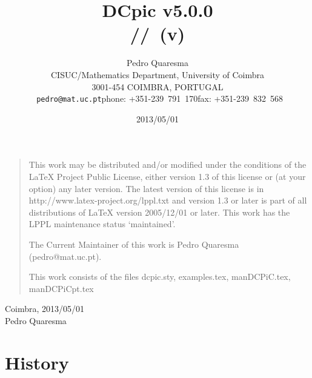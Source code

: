 \documentclass[11pt]{article}
\newcommand{\docversion}{\svnyear/\svnmonth/\svnday\ (v\svnrev)}
\def\dcpicversion{v5.0.0}
\begin{document}
\title{DCpic \dcpicversion\\
\docversion}
\author{Pedro Quaresma\\ CISUC/Mathematics Department,
  University of Coimbra\\ 3001-454 COIMBRA, PORTUGAL\\ {\tt
    pedro@mat.uc.pt}\quad phone: +351-239~791~170\quad fax:
  +351-239~832~568}  
\date{2013/05/01}


\maketitle

\vfill
\begin{quotation}
This work may be distributed and/or modified under the
conditions of the LaTeX Project Public License, either version 1.3
of this license or (at your option) any later version.
The latest version of this license is in
  http://www.latex-project.org/lppl.txt
and version 1.3 or later is part of all distributions of LaTeX
version 2005/12/01 or later.
This work has the LPPL maintenance status `maintained'.

The Current Maintainer of this work is Pedro Quaresma (pedro@mat.uc.pt).

This work consists of the files dcpic.sty, examples.tex,
manDCPiC.tex, manDCPiCpt.tex
\end{quotation}

\vspace*{2cm}
\noindent Coimbra, 2013/05/01\\
Pedro Quaresma

\pagebreak
\section{History}
\end{document}
